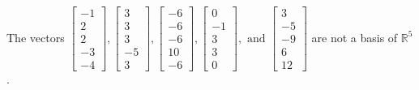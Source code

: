 \begin{exercise}
\begin{exerciseStatement}
  \end{exerciseStatement}
  \begin{exerciseAnswer}
   The vectors \(\left[\begin{array}{r}
-1 \\
2 \\
2 \\
-3 \\
-4
\end{array}\right] , \left[\begin{array}{r}
3 \\
3 \\
3 \\
-5 \\
3
\end{array}\right] , \left[\begin{array}{r}
-6 \\
-6 \\
-6 \\
10 \\
-6
\end{array}\right] , \left[\begin{array}{r}
0 \\
-1 \\
3 \\
3 \\
0
\end{array}\right] , \text{ and } \left[\begin{array}{r}
3 \\
-5 \\
-9 \\
6 \\
12
\end{array}\right]\) 
  	 are not  a basis of \(\mathbb{R}^5\).
  


  \end{exerciseAnswer}
\end{exercise}